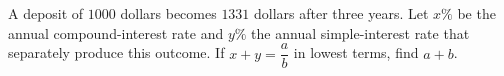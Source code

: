 A deposit of $1000$ dollars becomes $1331$ dollars after three years. Let $x\%$ be the annual compound-interest rate and $y\%$ the annual simple-interest rate that separately produce this outcome. If $x+y=\dfrac{a}{b}$ in lowest terms, find $a+b$.
